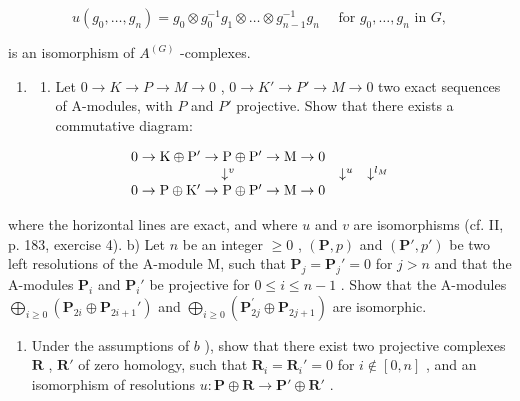 \[
u \left(g _ {0}, \dots , g _ {n}\right) = g _ {0} \otimes g _ {0} ^ {- 1} g _ {1} \otimes \dots \otimes g _ {n - 1} ^ {- 1} g _ {n} \quad \text { for } g _ {0}, \dots , g _ {n} \text { in } G,
\]

is an isomorphism of \(A^{(G)}\) -complexes.

\begin{enumerate}
\def\labelenumi{\arabic{enumi})}
\setcounter{enumi}{4}
\tightlist
\item
  \begin{enumerate}
  \def\labelenumii{\alph{enumii})}
  \tightlist
  \item
    Let \(0 \to K \to P \to M \to 0\) , \(0 \to K' \to P' \to M \to 0\) two exact sequences of A-modules, with \(P\) and \(P'\) projective. Show that there exists a commutative diagram:
  \end{enumerate}
\end{enumerate}

\[
\begin{array}{c c c}0 \rightarrow \mathrm{K} \oplus \mathrm{P} ^ {\prime} \rightarrow \mathrm{P} \oplus \mathrm{P} ^ {\prime} \rightarrow \mathrm{M} \rightarrow 0\\\downarrow^ {v}&\downarrow^ {u}&\downarrow^ {l _ {M}}\\0 \rightarrow \mathrm{P} \oplus \mathrm{K} ^ {\prime} \rightarrow \mathrm{P} \oplus \mathrm{P} ^ {\prime} \rightarrow \mathrm{M} \rightarrow 0\end{array}
\]

where the horizontal lines are exact, and where \(u\) and \(v\) are isomorphisms (cf. II, p. 183, exercise 4). b) Let \(n\) be an integer \(\geqslant 0\) , \((\mathbf{P}, p)\) and \((\mathbf{P}', p')\) be two left resolutions of the A-module M, such that \(\mathbf{P}_j = \mathbf{P}_j' = 0\) for \(j > n\) and that the A-modules \(\mathbf{P}_i\) and \(\mathbf{P}_i'\) be projective for \(0 \leqslant i \leqslant n - 1\) . Show that the A-modules \(\bigoplus_{i \geqslant 0} (\mathbf{P}_{2i} \oplus \mathbf{P}_{2i+1}')\) and \(\bigoplus_{i \geqslant 0} (\mathbf{P}_{2j}^{\prime} \oplus \mathbf{P}_{2j+1})\) are isomorphic.

\begin{enumerate}
\def\labelenumi{\alph{enumi})}
\setcounter{enumi}{2}
\tightlist
\item
  Under the assumptions of \(b\) ), show that there exist two projective complexes \(\mathbf{R}\) , \(\mathbf{R}'\) of zero homology, such that \(\mathbf{R}_i = \mathbf{R}_i' = 0\) for \(i \notin [0, n]\) , and an isomorphism of resolutions \(u: \mathbf{P} \oplus \mathbf{R} \to \mathbf{P}' \oplus \mathbf{R}'\) .
\end{enumerate}

